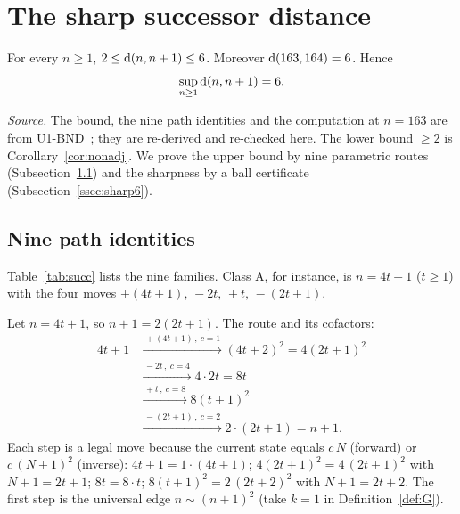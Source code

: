 \section{The sharp successor distance}\label{sec:successor}
\begin{theorem}\label{thm:successor}
For every $n\ge1$, $2\le\operatorname{d}(n,n+1)\le6$. Moreover $\operatorname{d}(163,164)=6$. Hence
\[
\sup_{n\ge1}\operatorname{d}(n,n+1)=6.
\]
\end{theorem}
\noindent\emph{Source.} The bound, the nine path identities and the computation at $n=163$ are from U1-BND~\cite{u1bnd}; they are re-derived and re-checked here.
The lower bound $\ge2$ is Corollary~\ref{cor:nonadj}. We prove the upper bound by nine parametric routes (Subsection~\ref{ssec:nine}) and the sharpness by a ball certificate (Subsection~\ref{ssec:sharp6}).

\subsection{Nine path identities}\label{ssec:nine}
Table~\ref{tab:succ} lists the nine families. Class A, for instance, is $n=4t+1$ ($t\ge1$) with the four moves $+(4t+1),\,-2t,\,+t,\,-(2t+1)$.

\begin{table}[ht]\centering\small

\caption{The nine classes of the successor identity: $n=Mt+r$ with the stated range of $t$, and the labels of the route from $n$ to $n+1$. Moduli: $4$ for A, $8$ for B--E and G, $24$ for F, H, I.}\label{tab:succ}\end{table}

\begin{example}\label{ex:A}
Let $n=4t+1$, so $n+1=2(2t+1)$. The route and its cofactors:
\begin{align*}
4t+1 &\xrightarrow{\,+(4t+1)\,,\ c=1\,} (4t+2)^2=4(2t+1)^2 \\
&\xrightarrow{\,-2t\,,\ c=4\,} 4\cdot 2t=8t \\
&\xrightarrow{\,+t\,,\ c=8\,} 8(t+1)^2 \\
&\xrightarrow{\,-(2t+1)\,,\ c=2\,} 2\cdot(2t+1)=n+1.
\end{align*}
Each step is a legal move because the current state equals $c\,N$ (forward) or $c\,(N+1)^2$ (inverse): $4t+1=1\cdot(4t+1)$; $4(2t+1)^2=4\,(2t+1)^2$ with $N+1=2t+1$; $8t=8\cdot t$; $8(t+1)^2=2\,(2t+2)^2$ with $N+1=2t+2$. The first step is the universal edge $n\sim(n+1)^2$ (take $k=1$ in Definition~\ref{def:G}).
\end{example}

